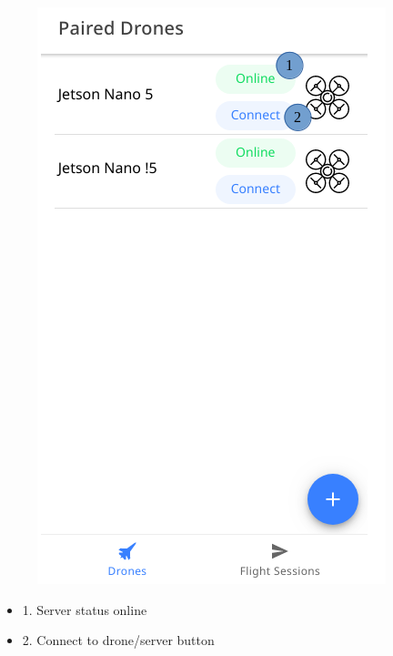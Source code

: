 \begin{figure}[h!]
	\centering
	\includegraphics[scale=0.5]{./assets/images/online.png}
	\label{fig: screens}
	\caption{}
\end{figure}
\newpage
\begin{itemize}
		\item 1. Server status online
		\item 2. Connect to drone/server button
\end{itemize}

